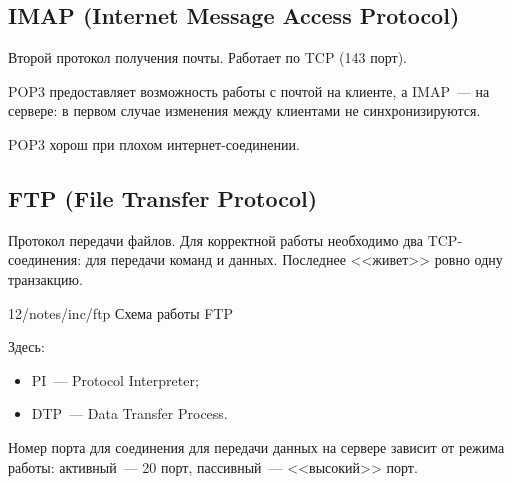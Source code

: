 \subsection{IMAP (Internet Message Access Protocol)}

Второй протокол получения почты. Работает по TCP (143 порт).

POP3 предоставляет возможность работы с почтой на клиенте, а IMAP~--- на
сервере: в первом случае изменения между клиентами не синхронизируются.

POP3 хорош при плохом интернет-соединении.

\subsection{FTP (File Transfer Protocol)}

Протокол передачи файлов. Для корректной работы необходимо два TCP-соединения: для передачи команд и данных. Последнее <<живет>> ровно одну транзакцию.

\image
{\textwidth}
{12/notes/inc/ftp}
{Схема работы FTP}

Здесь:

\begin{itemize}
    \item PI~--- Protocol Interpreter;
    \item DTP~--- Data Transfer Process.
\end{itemize}

Номер порта для соединения для передачи данных на сервере зависит от режима работы: активный~--- 20 порт, пассивный~--- <<высокий>> порт.

